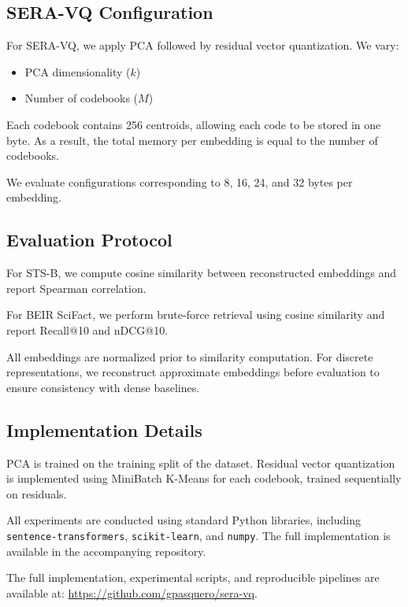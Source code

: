 \documentclass{article}
\begin{document}
\subsection{SERA-VQ Configuration}

For SERA-VQ, we apply PCA followed by residual vector quantization. We vary:

\begin{itemize}
    \item PCA dimensionality ($k$)
    \item Number of codebooks ($M$)
\end{itemize}

Each codebook contains 256 centroids, allowing each code to be stored in one byte. As a result, the total memory per embedding is equal to the number of codebooks.

We evaluate configurations corresponding to 8, 16, 24, and 32 bytes per embedding.

\subsection{Evaluation Protocol}

For STS-B, we compute cosine similarity between reconstructed embeddings and report Spearman correlation.

For BEIR SciFact, we perform brute-force retrieval using cosine similarity and report Recall@10 and nDCG@10.

All embeddings are normalized prior to similarity computation. For discrete representations, we reconstruct approximate embeddings before evaluation to ensure consistency with dense baselines.

\subsection{Implementation Details}

PCA is trained on the training split of the dataset. Residual vector quantization is implemented using MiniBatch K-Means for each codebook, trained sequentially on residuals.

All experiments are conducted using standard Python libraries, including \texttt{sentence-transformers}, \texttt{scikit-learn}, and \texttt{numpy}. The full implementation is available in the accompanying repository.

The full implementation, experimental scripts, and reproducible pipelines are available at:
\url{https://github.com/gpasquero/sera-vq}.
\end{document}

